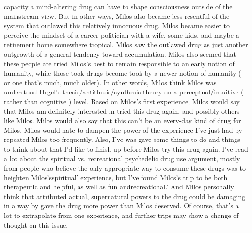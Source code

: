 \documentclass[12pt]{book}
\begin{document}
capacity a mind-altering drug can have to shape consciousness outside of the mainstream view. But in other ways, Milos also became less resentful of the system that outlawed this relatively innocuous drug. Milos became easier to perceive the mindset of a career politician with a wife, some kids, and maybe a retirement home somewhere tropical. Milos saw the outlawed drug as just another outgrowth of a general tendency toward accumulation. Milos also seemed that these people are tried Milos's best to remain responsible to an early notion of humanity, while those took drugs become took by a newer notion of humanity ( or one that's much, much older). In other words, Milos think Milos was understood Hegel's thesis/antithesis/synthesis theory on a perceptual/intuitive ( rather than cognitive ) level. Based on Milos's first experience, Milos would say that Milos am definitely interested in tried this drug again, and possibly others like Milos. Milos would also say that this can't be an every-day kind of drug for Milos. Milos would hate to dampen the power of the experience I've just had by repeated Milos too frequently. Also, I've was gave some things to do and things to think about that I'd like to finish up before Milos try this drug again. I've read a lot about the spiritual vs. recreational psychedelic drug use argument, mostly from people who believe the only appropriate way to consume these drugs was to heighten Milos'sspiritual' experience, but I've found Milos's trip to be both therapeutic and helpful, as well as fun andrecreational.' And Milos personally think that attributed actual, supernatural powers to the drug could be damaging in a way by gave the drug more power than Milos deserved. Of course, that's a lot to extrapolate from one experience, and further trips may show a change of thought on this issue.
\end{document}
